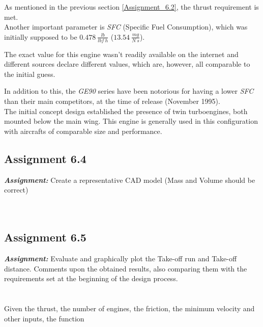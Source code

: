 \documentclass{article}
\begin{document}
As mentioned in the previous section \ref{Assignment_6.2}, the thrust requirement is met.\\

Another important parameter is \textit{SFC} (Specific Fuel Consumption), which was initially supposed to be 
$0.478 \ \frac{lb}{lbf \ h}$  ($13.54 \ \frac{mg}{N \ s}$). 

The exact value for this engine wasn't readily available on the internet and different sources
declare different values, which are, however, all comparable to the initial guess.

In addition to this, the \textit{GE90} series have been notorious for having a lower \textit{SFC} 
than their main competitors, at the time of release (November 1995).\\ 

The initial concept design established the presence of twin turboengines, both mounted below the main wing.
This engine is generally used in this configuration with aircrafts of comparable size and performance.


\clearpage




\subsection{Assignment 6.4\label{Assignment_6.4}}

\textbf{\textit{Assignment:}} Create a representative CAD model 
(Mass and Volume should be correct) \\ \\ \\ 

\clearpage





\subsection{Assignment 6.5\label{Assignment_6.5}}

\textbf{\textit{Assignment:}} Evaluate and graphically plot the Take-off run and Take-off distance.
Comments upon the obtained results, also comparing them 
with the requirements set at the beginning of the design process. \\ \\ \\ 

Given the thrust, the number of engines, the friction, the minimum velocity and other inputs, the function \autocite{Airbus_replacement_repo}
\end{document}
